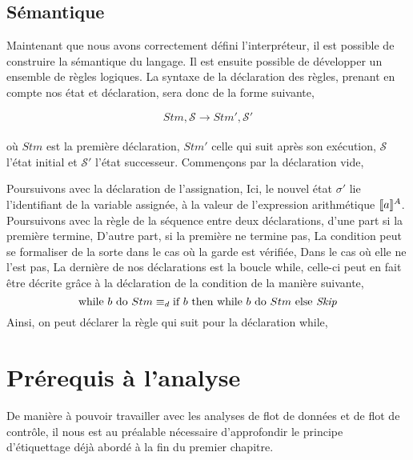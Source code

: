 \documentclass[a4paper, 12pt]{article}
\begin{document}
\subsection{Sémantique}
Maintenant que nous avons correctement défini l'interpréteur, il est possible 
de construire la sémantique du langage. Il est ensuite possible de développer 
un ensemble de règles logiques. La syntaxe de la déclaration des règles,
prenant en compte nos état et déclaration, sera donc de la forme suivante,

\[Stm, \mathcal{S} \longrightarrow Stm', \mathcal{S}'\]
\\
où $Stm$ est la première déclaration, $Stm'$ celle qui suit après son exécution, 
$\mathcal{S}$ l'état initial et $\mathcal{S}'$  l'état successeur. Commençons 
par la déclaration vide,

\srule{ }{\semanticd{\sskip}{\sigma}{\emptyset}{\sigma}}

Poursuivons avec la déclaration de l'assignation,
Ici, le nouvel état $\sigma'$ lie l'identifiant de la variable assignée, à la 
valeur de l'expression arithmétique $[\![{a}]\!]^{A}$. Poursuivons avec la règle 
de la séquence entre deux déclarations, d'une part si la première termine,
{}
D'autre part, si la première ne termine pas,
{}
La condition peut se formaliser de la sorte dans le cas où la garde est vérifiée,
{}
Dans le cas où elle ne l'est pas,
{}
La dernière de nos déclarations est la boucle while, celle-ci peut en fait être 
décrite grâce à la déclaration de la condition de la manière suivante,
\[
\text{while }{b}\text{ do }{Stm}
\equiv_d
\text{if }{b}\text{ then }{ \text{while }{b}\text{ do }{Stm} }\text{ else }{ \textit{Skip} }
\]
Ainsi, on peut déclarer la règle qui suit pour la déclaration while,
{}

\section{Prérequis à l'analyse}
De manière à pouvoir travailler avec les analyses de flot de données et de flot de contrôle, 
il nous est au préalable nécessaire d'approfondir le principe d'étiquettage déjà abordé à la fin du premier chapitre.
\end{document}
